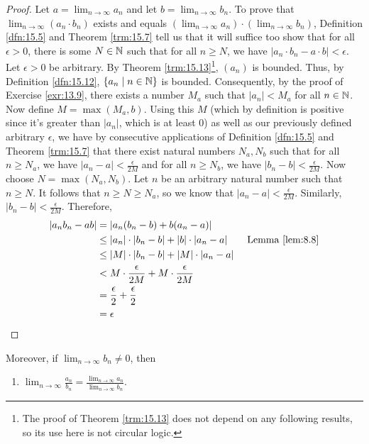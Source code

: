 \documentclass[../main.tex]{subfiles}
\begin{document}
\begin{theorem}
\begin{enumerate}[label={\textup{(}\alph*\textup{)}},ref={\thetheorem\alph*}]
\begin{proof}
            Let $a=\lim_{n\to\infty}a_n$ and let $b=\lim_{n\to\infty}b_n$. To prove that $\lim_{n\to\infty}(a_n\cdot b_n)$ exists and equals $\left( \lim_{n\to\infty}a_n \right)\cdot\left( \lim_{n\to\infty}b_n \right)$, Definition \ref{dfn:15.5} and Theorem \ref{trm:15.7} tell us that it will suffice too show that for all $\epsilon>0$, there is some $N\in\mathbb{N}$ such that for all $n\geq N$, we have $|a_n\cdot b_n-a\cdot b|<\epsilon$. Let $\epsilon>0$ be arbitrary. By Theorem \ref{trm:15.13}\footnote{The proof of Theorem \ref{trm:15.13} does not depend on any following results, so its use here is not circular logic.}, $(a_n)$ is bounded. Thus, by Definition \ref{dfn:15.12}, $\{a_n\mid n\in\mathbb{N}\}$ is bounded. Consequently, by the proof of Exercise \ref{exr:13.9}, there exists a number $M_a$ such that $|a_n|<M_a$ for all $n\in\mathbb{N}$. Now define $M=\max(M_a,b)$. Using this $M$ (which by definition is positive since it's greater than $|a_n|$, which is at least 0) as well as our previously defined arbitrary $\epsilon$, we have by consecutive applications of Definition \ref{dfn:15.5} and Theorem \ref{trm:15.7} that there exist natural numbers $N_a,N_b$ such that for all $n\geq N_a$, we have $|a_n-a|<\frac{\epsilon}{2M}$ and for all $n\geq N_b$, we have $|b_n-b|<\frac{\epsilon}{2M}$. Now choose $N=\max(N_a,N_b)$. Let $n$ be an arbitrary natural number such that $n\geq N$. It follows that $n\geq N\geq N_a$, so we know that $|a_n-a|<\frac{\epsilon}{2M}$. Similarly, $|b_n-b|<\frac{\epsilon}{2M}$. Therefore,
            \begin{align*}
                |a_nb_n-ab| &= |a_n(b_n-b)+b(a_n-a)|\\
                &\leq |a_n|\cdot|b_n-b|+|b|\cdot|a_n-a|\tag*{Lemma \ref{lem:8.8}}\\
                &\leq |M|\cdot|b_n-b|+|M|\cdot|a_n-a|\\
                &< M\cdot\frac{\epsilon}{2M}+M\cdot\frac{\epsilon}{2M}\\
                &= \frac{\epsilon}{2}+\frac{\epsilon}{2}\\
                &= \epsilon
            \end{align*}
        \end{proof}
    \end{enumerate}
    Moreover, if $\lim_{n\to\infty}b_n\neq 0$, then
    \begin{enumerate}[resume,label={\textup{(}\alph*\textup{)}},ref={\thetheorem\alph*}]
        \item \label{trm:15.9c}$\lim_{n\to\infty}\frac{a_n}{b_n}=\frac{\lim_{n\to\infty}a_n}{\lim_{n\to\infty}b_n}$.

\end{enumerate}
\end{theorem}
\end{document}
